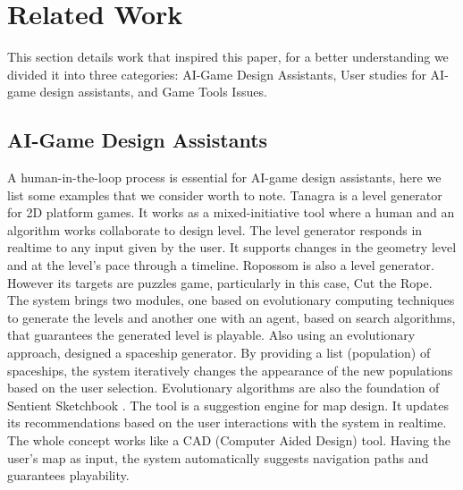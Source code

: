 \documentclass[letterpaper]{article} %
\begin{document}
\section{Related Work}
This section details work that inspired this paper, for a better understanding we divided it into three categories: AI-Game Design Assistants, User studies for AI-game design assistants, and Game Tools Issues.




\subsection{AI-Game Design Assistants}
A human-in-the-loop process is essential for AI-game design assistants, here we list some examples that we consider worth to note. Tanagra \cite{smith2010tanagra} is a level generator for 2D platform games.  It works as a mixed-initiative tool where a human and an algorithm works collaborate  to design level. The level generator responds in realtime to any input given by the user. It supports changes in the geometry level and at the level's pace through a timeline. Ropossom \cite{shaker2013ropossum} is also a level generator. However its targets are puzzles game, particularly in this case, Cut the Rope. The system brings two modules, one based on evolutionary computing techniques to generate the levels and another one with an agent, based on search algorithms, that guarantees the generated level is playable. Also using an evolutionary approach, \cite{6185648} designed a spaceship generator. By providing a list (population) of spaceships, the system iteratively changes the appearance of the new populations based on the user selection. Evolutionary algorithms are also the foundation of Sentient Sketchbook \cite{liapis2013sentient}. The tool is a suggestion engine for map design. It updates its recommendations based on the user interactions with the system in realtime. The whole concept works like a CAD (Computer Aided Design) tool. Having the user's map as input, the system automatically suggests navigation paths and guarantees playability.
\end{document}
